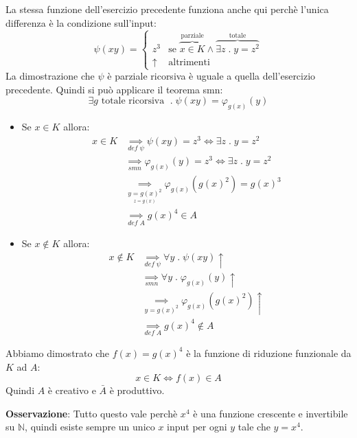 \documentclass[a4paper]{article}
\begin{document}
\begin{exercise}
\begin{enumerate}
      \vspace{1em}
      \noindent
      La stessa funzione dell'esercizio precedente funziona anche qui perchè
      l'unica differenza è la condizione sull'input:
      \[
        \psi(xy) = 
        \begin{cases}
          z^3 & \text{se } \overbrace{x \in K}^{\text{parziale}}
          \land \overbrace{\exists z \;.\; y = z^2}^{\text{totale}}\\
          \uparrow & \text{altrimenti}
        \end{cases}
      \] 
      La dimostrazione che \( \psi  \) è parziale ricorsiva è uguale a quella
      dell'esercizio precedente. Quindi si può applicare il teorema smn:
      \[
        \exists g \text{ totale ricorsiva } \;.\; \psi(xy) = \varphi_{g(x)}(y)
      \] 
      \begin{itemize}
        \item Se \( x \in K \) allora:
          \[
            \begin{aligned}
              x \in K &\underset{def\; \psi}{\implies} \psi(xy) = z^3 \iff 
              \exists z \;.\; y = z^2\\
                      &\underset{smn}{\implies} \varphi_{g(x)}(y) = z^3 \iff
              \exists z \;.\; y = z^2\\
                      &\underset{\underset{z = g(x)}{y = g(x)^2}}{\implies} \varphi_{g(x)}(g(x)^2) = g(x)^3\\
                      &\underset{def\; A}{\implies} g(x)^4 \in A
            \end{aligned}
          \]
        \item Se \( x \notin K \) allora:
          \[
            \begin{aligned}
              x \notin K &\underset{def\; \psi}{\implies} \forall y \;.\; \psi(xy)\uparrow\\
                         &\underset{smn}{\implies} \forall y \;.\; \varphi_{g(x)}(y) \uparrow\\
                         &\underset{y = g(x)^2}{\implies} \varphi_{g(x)}(g(x)^2) \uparrow\\
                         &\underset{def\; A}{\implies} g(x)^4 \notin A
            \end{aligned}
          \]
      \end{itemize}
      Abbiamo dimostrato che \( f(x) = g(x)^4 \) è la funzione di riduzione funzionale
      da \( K \) ad \( A \):
      \[
        x \in K \iff f(x) \in A
      \]
      Quindi \( A \) è creativo e \( \bar{A} \) è produttivo.
  \end{enumerate}

  \textbf{Osservazione}: Tutto questo vale perchè \( x^4 \) è una funzione crescente
  e invertibile su \( \mathbb{N} \), quindi esiste sempre un unico \( x \) input
  per ogni \( y \) tale che \( y = x^4 \).
\end{exercise}
\end{document}
